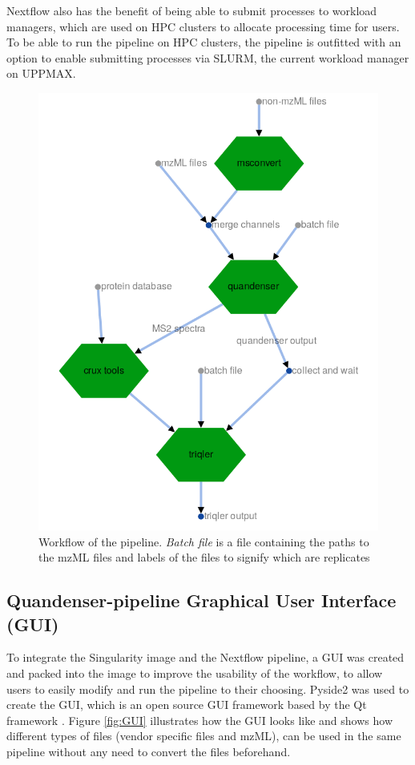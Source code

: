 Nextflow also has the benefit of being able to submit processes to workload managers, which are used on HPC clusters to allocate processing time for users. To be able to run the pipeline on HPC clusters, the pipeline is outfitted with an option to enable submitting processes via SLURM, the current workload manager on UPPMAX.

\begin{figure}[H]
  \centering
  \includegraphics[width=0.5\linewidth]{pictures/workflow.png}
  \caption{Workflow of the pipeline. \textit{Batch file} is a file containing the paths to the mzML files and labels of the files to signify which are replicates}
  \label{fig:workflow}
\end{figure}

\subsection{Quandenser-pipeline Graphical User Interface (GUI)}
To integrate the Singularity image and the Nextflow pipeline, a GUI was created and packed into the image to improve the usability of the workflow, to allow users to easily modify and run the pipeline to their choosing. Pyside2 was used to create the GUI, which is an open source GUI framework based by the Qt framework \cite{pyside2}. Figure \ref{fig:GUI} illustrates how the GUI looks like and shows how different types of files (vendor specific files and mzML), can be used in the same pipeline without any need to convert the files beforehand.

